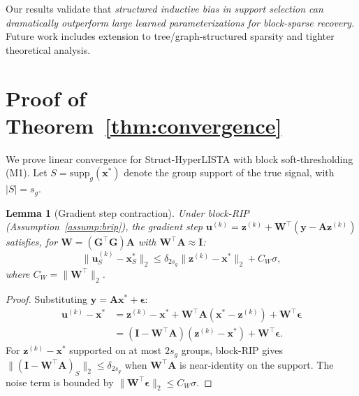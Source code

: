 \documentclass{article}
\newtheorem{lemma}{Lemma}
\begin{document}
Our results validate that \emph{structured inductive bias in support selection can dramatically outperform large learned parameterizations for block-sparse recovery}. Future work includes extension to tree/graph-structured sparsity and tighter theoretical analysis.




\newpage
\appendix
\section{Proof of Theorem~\ref{thm:convergence}}
\label{app:proof}

We prove linear convergence for Struct-HyperLISTA with block soft-thresholding (M1). Let $S = \text{supp}_g(\mathbf{x}^*)$ denote the group support of the true signal, with $|S| = s_g$.

\begin{lemma}[Gradient step contraction]
\label{lem:contraction}
Under block-RIP (Assumption~\ref{assump:brip}), the gradient step $\mathbf{u}^{(k)} = \mathbf{z}^{(k)} + \mathbf{W}^\top(\mathbf{y} - \mathbf{A}\mathbf{z}^{(k)})$ satisfies, for $\mathbf{W} = (\mathbf{G}^\top\mathbf{G})\mathbf{A}$ with $\mathbf{W}^\top\mathbf{A} \approx \mathbf{I}$:
\[
\|\mathbf{u}^{(k)}_S - \mathbf{x}^*_S\|_2 \leq \delta_{2s_g} \|\mathbf{z}^{(k)} - \mathbf{x}^*\|_2 + C_W\sigma,
\]
where $C_W = \|\mathbf{W}^\top\|_2$.
\end{lemma}
\begin{proof}
Substituting $\mathbf{y} = \mathbf{A}\mathbf{x}^* + \boldsymbol{\epsilon}$:
\begin{align*}
\mathbf{u}^{(k)} - \mathbf{x}^* &= \mathbf{z}^{(k)} - \mathbf{x}^* + \mathbf{W}^\top\mathbf{A}(\mathbf{x}^* - \mathbf{z}^{(k)}) + \mathbf{W}^\top\boldsymbol{\epsilon} \\
&= (\mathbf{I} - \mathbf{W}^\top\mathbf{A})(\mathbf{z}^{(k)} - \mathbf{x}^*) + \mathbf{W}^\top\boldsymbol{\epsilon}.
\end{align*}
For $\mathbf{z}^{(k)} - \mathbf{x}^*$ supported on at most $2s_g$ groups, block-RIP gives $\|(\mathbf{I} - \mathbf{W}^\top\mathbf{A})_S\|_2 \leq \delta_{2s_g}$ when $\mathbf{W}^\top\mathbf{A}$ is near-identity on the support. The noise term is bounded by $\|\mathbf{W}^\top\boldsymbol{\epsilon}\|_2 \leq C_W\sigma$.
\end{proof}
\end{document}
